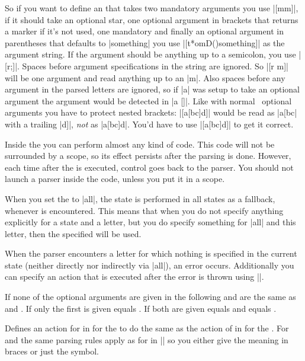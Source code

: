 \begin{command}
  So if you want to define an  that takes two mandatory arguments
  you use |[mm]|, if it should take an optional star, one optional argument in
  brackets that returns a marker if it's not used, one mandatory and finally an
  optional argument in parentheses that defaults to |something| you use
  |[t*omD(){something}]| as the argument string. If the argument should be
  anything up to a semicolon, you use |[r;]|. Spaces before argument
  specifications in the string are ignored. So |[r m]| will be one argument and
  read anything up to an |m|. Also spaces before any argument in the parsed
  letters are ignored, so if |a| was setup to take an optional argument the
  argument would be detected in |a []|. Like with normal \LaTeXe\ optional
  arguments you have to protect nested brackets: |[a[bc]d]| would be read as
  |a[bc| with a trailing |d]|, \emph{not} as |a[bc]d|. You'd have to use
  |[{a[bc]d}]| to get it correct.

  Inside the  you can perform almost any kind of code. This code
  will not be surrounded by a scope, so its effect persists after the parsing
  is done. However, each time after the  is executed, control
  goes back to the parser. You should not launch a parser inside the
   code, unless you put it in a scope.

  When you set the  to |all|, the state  is performed
  in all states as a fallback, whenever  is encountered.
  This means that when you do not specify anything explicitly for a state and a
  letter, but you do specify something for |all| and this letter, then the
  specified  will be used.

  When the parser encounters a letter for which nothing is specified in the
  current state (neither directly nor indirectly via |all|), an error occurs.
  Additionally you can specify an action that is executed after the error is
  thrown using |\pgfparserdefunknown|.
\end{command}%

\begin{command}%
  {%
    \pgfparserlet
  }%
  If none of the optional arguments are given in the following  and  are the same as  and
  . If only the first is given  equals
  . If both are given  equals  and
   equals .

  Defines an action for  in  for the
   to do the same as the action of 
  in  for the . For 
  and  the same parsing rules apply as for  in |\pgfparserdef| so you either give the meaning in braces or just
  the symbol.
\end{command}%

